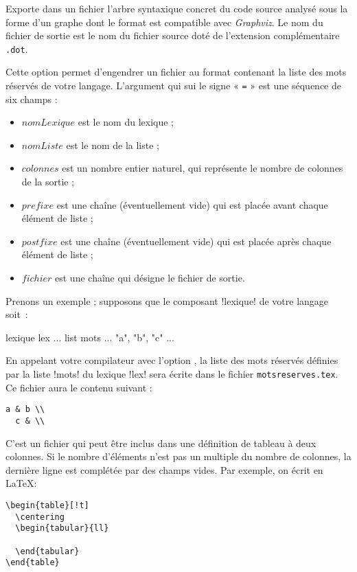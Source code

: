  Exporte dans un fichier l'arbre syntaxique concret du code source analysé sous la forme d'un graphe dont le format est compatible avec \emph{Graphviz}. Le nom du fichier de sortie est le nom du fichier source doté de l'extension complémentaire \texttt{.dot}.


 Cette option permet d'engendrer un fichier au format contenant la liste des mots réservés de votre langage. L'argument qui sui le signe « \texttt{=} » est une séquence de six champs :
\begin{itemize}
  \item $nomLexique$ est le nom du lexique ;
  \item $nomListe$ est le nom de la liste ;
  \item $colonnes$ est un nombre entier naturel, qui représente le nombre de colonnes de la sortie ;
  \item $prefixe$ est une chaîne (éventuellement vide) qui est placée avant chaque élément de liste ;
  \item $postfixe$ est une chaîne (éventuellement vide) qui est placée après chaque élément de liste ;
  \item $fichier$ est une chaîne qui désigne le fichier de sortie.
\end{itemize}

Prenons un exemple ; supposons que le composant \ggs!lexique! de votre langage soit~:
\begin{galgas}
lexique lex {
  ...
  list mots ... { "a", "b", "c" }
  ...
}
\end{galgas}

En appelant votre compilateur avec l'option , la liste des mots réservés définies par la liste \ggs!mots! du lexique \ggs!lex! sera écrite dans le fichier \texttt{motsreserves.tex}. Ce fichier aura le contenu suivant :
\begin{lstlisting}[backgroundcolor=\color{yellow!10}, frame=tlbr, basicstyle=\small\tt]
  a & b \\
  c & \\
\end{lstlisting}

C'est un fichier qui peut être inclus dans une définition de tableau à deux colonnes. Si le nombre d'éléments n'est pas un multiple du nombre de colonnes, la dernière ligne est complétée par des champs vides. Par exemple, on écrit en \LaTeX :
\begin{lstlisting}[backgroundcolor=\color{yellow!10}, frame=tlbr, basicstyle=\small\tt]
\begin{table}[!t]
  \centering
  \begin{tabular}{ll}
    
  \end{tabular}
\end{table}
\end{lstlisting}

